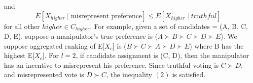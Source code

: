 \documentclass[letterpaper]{article} %
\begin{document}
and 
\begin{equation}
E[X_{higher} \mid \text{misrepresent preference}] \le E[X_{higher} \mid truthful]
\end{equation}
$\text{for all other } higher \in C_{higher}.$
For example, given a set of candidates = (A, B, C, D, E), suppose a manipulator’s true preference is ($A\succ B\succ C\succ D\succ E$). We suppose aggregated ranking of E[$X_c$] is ($B\succ C\succ A\succ D\succ E$) where B has the highest E[$X_c$]. For $l=2$, if candidate assignment is (C, D), then the manipulator has an incentive to misrepresent his preference. Since truthful voting is $C\succ D$, and misrepresented vote is $D \succ C$, the inequality $(2)$ is satisfied. 
\end{document}
